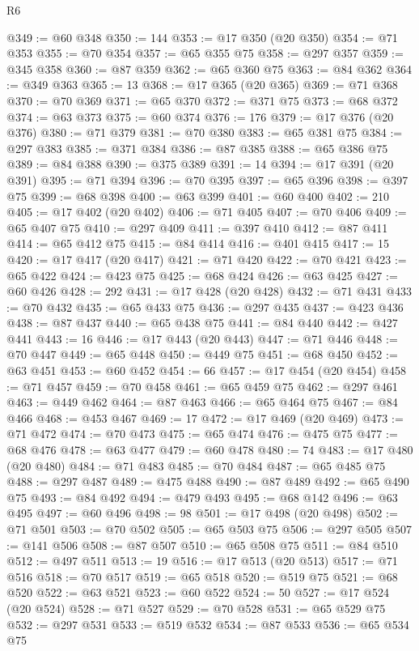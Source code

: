 \begin{lexlean}{R6}
\begin{coremodule}
@349 := @60 @348
@350 := 144
@353 := @17 @350 (@20 @350)
@354 := @71 @353
@355 := @70 @354
@357 := @65 @355 @75
@358 := @297 @357
@359 := @345 @358
@360 := @87 @359
@362 := @65 @360 @75
@363 := @84 @362
@364 := @349 @363
@365 := 13
@368 := @17 @365 (@20 @365)
@369 := @71 @368
@370 := @70 @369
@371 := @65 @370
@372 := @371 @75
@373 := @68 @372
@374 := @63 @373
@375 := @60 @374
@376 := 176
@379 := @17 @376 (@20 @376)
@380 := @71 @379
@381 := @70 @380
@383 := @65 @381 @75
@384 := @297 @383
@385 := @371 @384
@386 := @87 @385
@388 := @65 @386 @75
@389 := @84 @388
@390 := @375 @389
@391 := 14
@394 := @17 @391 (@20 @391)
@395 := @71 @394
@396 := @70 @395
@397 := @65 @396
@398 := @397 @75
@399 := @68 @398
@400 := @63 @399
@401 := @60 @400
@402 := 210
@405 := @17 @402 (@20 @402)
@406 := @71 @405
@407 := @70 @406
@409 := @65 @407 @75
@410 := @297 @409
@411 := @397 @410
@412 := @87 @411
@414 := @65 @412 @75
@415 := @84 @414
@416 := @401 @415
@417 := 15
@420 := @17 @417 (@20 @417)
@421 := @71 @420
@422 := @70 @421
@423 := @65 @422
@424 := @423 @75
@425 := @68 @424
@426 := @63 @425
@427 := @60 @426
@428 := 292
@431 := @17 @428 (@20 @428)
@432 := @71 @431
@433 := @70 @432
@435 := @65 @433 @75
@436 := @297 @435
@437 := @423 @436
@438 := @87 @437
@440 := @65 @438 @75
@441 := @84 @440
@442 := @427 @441
@443 := 16
@446 := @17 @443 (@20 @443)
@447 := @71 @446
@448 := @70 @447
@449 := @65 @448
@450 := @449 @75
@451 := @68 @450
@452 := @63 @451
@453 := @60 @452
@454 := 66
@457 := @17 @454 (@20 @454)
@458 := @71 @457
@459 := @70 @458
@461 := @65 @459 @75
@462 := @297 @461
@463 := @449 @462
@464 := @87 @463
@466 := @65 @464 @75
@467 := @84 @466
@468 := @453 @467
@469 := 17
@472 := @17 @469 (@20 @469)
@473 := @71 @472
@474 := @70 @473
@475 := @65 @474
@476 := @475 @75
@477 := @68 @476
@478 := @63 @477
@479 := @60 @478
@480 := 74
@483 := @17 @480 (@20 @480)
@484 := @71 @483
@485 := @70 @484
@487 := @65 @485 @75
@488 := @297 @487
@489 := @475 @488
@490 := @87 @489
@492 := @65 @490 @75
@493 := @84 @492
@494 := @479 @493
@495 := @68 @142
@496 := @63 @495
@497 := @60 @496
@498 := 98
@501 := @17 @498 (@20 @498)
@502 := @71 @501
@503 := @70 @502
@505 := @65 @503 @75
@506 := @297 @505
@507 := @141 @506
@508 := @87 @507
@510 := @65 @508 @75
@511 := @84 @510
@512 := @497 @511
@513 := 19
@516 := @17 @513 (@20 @513)
@517 := @71 @516
@518 := @70 @517
@519 := @65 @518
@520 := @519 @75
@521 := @68 @520
@522 := @63 @521
@523 := @60 @522
@524 := 50
@527 := @17 @524 (@20 @524)
@528 := @71 @527
@529 := @70 @528
@531 := @65 @529 @75
@532 := @297 @531
@533 := @519 @532
@534 := @87 @533
@536 := @65 @534 @75

\end{coremodule}
\end{lexlean}
